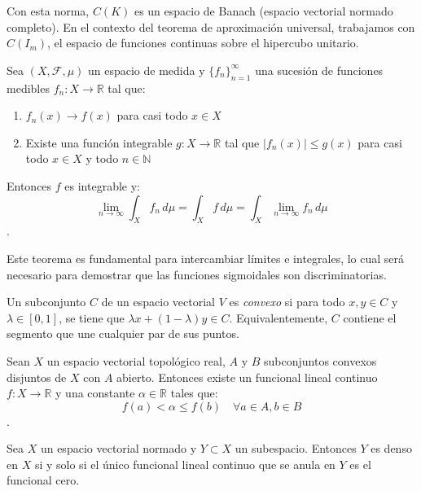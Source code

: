 Con esta norma, $C(K)$ es un espacio de Banach (espacio vectorial normado completo). En el contexto del teorema de aproximación universal, trabajamos con $C(I_m)$, el espacio de funciones continuas sobre el hipercubo unitario.

\begin{theorem}\label{thm:convergencia_dominada}
	Sea \((X, \mathcal{F}, \mu)\) un espacio de medida y \(\{f_n\}_{n=1}^\infty\) una sucesión de funciones medibles \(f_n: X \to \mathbb{R}\) tal que:
	\begin{enumerate}
		\item \(f_n(x) \to f(x)\) para casi todo \(x \in X\)
		\item Existe una función integrable \(g: X \to \mathbb{R}\) tal que \(|f_n(x)| \leq g(x)\) para casi todo \(x \in X\) y todo \(n \in \mathbb{N}\)
	\end{enumerate}
	Entonces \(f\) es integrable y:
	\[
		\lim_{n \to \infty} \int_X f_n \, d\mu = \int_X f \, d\mu = \int_X \lim_{n \to \infty} f_n \, d\mu
	\]
	\citep[Teorema~2.24]{Folland1999}.
\end{theorem}

Este teorema es fundamental para intercambiar límites e integrales, lo cual será necesario para demostrar que las funciones sigmoidales son discriminatorias.

\begin{definition}\label{def:conjunto_convexo}
	Un subconjunto $C$ de un espacio vectorial $V$ es \textit{convexo} si para todo $x, y \in C$ y $\lambda \in [0,1]$, se tiene que $\lambda x + (1-\lambda)y \in C$. Equivalentemente, $C$ contiene el segmento que une cualquier par de sus puntos.
\end{definition}

\begin{theorem}\label{thm:hahn_banach}
	Sean \(X\) un espacio vectorial topológico real, \(A\) y \(B\) subconjuntos convexos disjuntos de \(X\) con \(A\) abierto. Entonces existe un funcional lineal continuo \(f: X \to \mathbb{R}\) y una constante \(\alpha \in \mathbb{R}\) tales que:
	\[
		f(a) < \alpha \leq f(b) \quad \forall a \in A, b \in B
	\]
	\citep[Teorema~5.5]{Folland1999}.
\end{theorem}

\begin{corollary}\label{cor:caracterizacion_densidad}
	Sea \(X\) un espacio vectorial normado y \(Y \subset X\) un subespacio. Entonces \(Y\) es denso en \(X\) si y solo si el único funcional lineal continuo que se anula en \(Y\) es el funcional cero.
\end{corollary}

